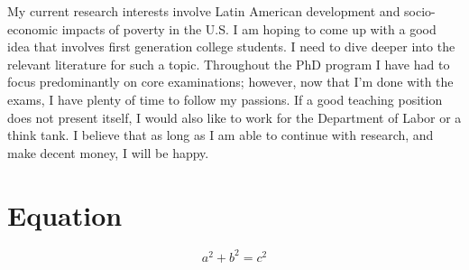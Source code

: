 \documentclass{article}
\begin{document}
My current research interests involve Latin 
American development and socio-economic impacts of poverty in the U.S. I am hoping to come up with a good idea that involves first generation college students. I need to dive deeper into the relevant literature for such a topic. Throughout the PhD program I have had to focus predominantly on core examinations; however, now that I'm done with the exams, I have plenty of time to follow my passions. If a good teaching position does not present itself, I would also like to work for the Department of Labor or a think tank. I believe that as long as I am able to continue with research, and make decent money, I will be happy. 

\section{Equation}

\begin{equation}
    a^2+b^2=c^2
\end{equation}
\end{document}
